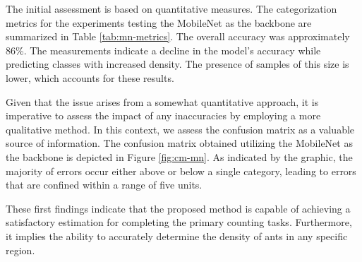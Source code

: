 The initial assessment is based on quantitative measures. The categorization metrics for the experiments testing the MobileNet as the backbone are summarized in Table \ref{tab:mn-metrics}. The overall accuracy was approximately 86\%. The measurements indicate a decline in the model's accuracy while predicting classes with increased density. The presence of samples of this size is lower, which accounts for these results.

Given that the issue arises from a somewhat quantitative approach, it is imperative to assess the impact of any inaccuracies by employing a more qualitative method. In this context, we assess the confusion matrix as a valuable source of information. The confusion matrix obtained utilizing the MobileNet as the backbone is depicted in Figure \ref{fig:cm-mn}. As indicated by the graphic, the majority of errors occur either above or below a single category, leading to errors that are confined within a range of five units.

These first findings indicate that the proposed method is capable of achieving a satisfactory estimation for completing the primary counting tasks. Furthermore, it implies the ability to accurately determine the density of ants in any specific region.

\begin{table}[h!]
\centering
\caption{EfficientNet V2-B0 classification metrics}
\label{tab:en-metrics}
\end{table}

